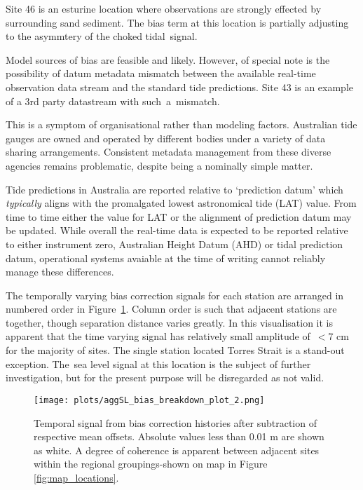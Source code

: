 \documentclass[jmse,article,accept,moreauthors,pdftex,10pt,a4paper]{mdpi}
\begin{document}
Site 46 is an esturine location where observations are strongly effected by surrounding sand sediment. The bias term at this location is partially adjusting to the asymmtery of the choked tidal~signal. 


Model sources of bias are feasible and likely.
However, of special note is the possibility of datum metadata mismatch between the available real-time observation data stream and the standard tide predictions. 
Site 43 is an example of a 3rd party datastream with such~a~mismatch. 

This is a symptom of organisational rather than modeling factors.   
Australian tide gauges are owned and operated by different bodies under a variety of data sharing arrangements.
Consistent metadata management from these diverse agencies remains problematic, despite being a nominally simple matter.

Tide predictions in Australia are reported relative to `prediction datum' which \textit{typically} aligns with the promalgated lowest astronomical tide (LAT) value.   
From time to time either the value for LAT or the alignment of prediction datum may be updated.  
While overall the real-time data is expected to be reported relative to either instrument zero, Australian Height Datum (AHD) or tidal prediction datum, operational systems avaiable at the time of writing cannot reliably manage these differences.


The temporally varying bias correction signals for each station are arranged in numbered order in Figure~\ref{fig:bias_time}.
Column order is such that adjacent stations are together, though separation distance varies greatly. 
In this visualisation it is apparent that the time varying signal has relatively small amplitude of~$<$7 cm for the majority of sites.
The single station located Torres Strait is a stand-out exception.  The~sea level signal at this location is the subject of further investigation, but for the present purpose will be disregarded as not valid.  


\begin{figure}[H]
\centering
\texttt{[image: plots/aggSL\_bias\_breakdown\_plot\_2.png]}
\caption{Temporal signal from bias correction histories after subtraction of respective mean offsets.  Absolute values less than 0.01 m are shown as white.  A degree of coherence is apparent between adjacent sites within the regional groupings-shown on map in Figure \ref{fig:map_locations}. } 
\label{fig:bias_time}
\end{figure}  
\end{document}
